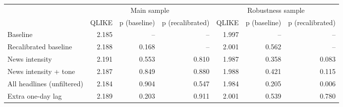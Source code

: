 \begin{tabular}{lrrrrrr}
\toprule
 & \multicolumn{3}{c}{Main sample} & \multicolumn{3}{c}{Robustness sample} \\
 & QLIKE & p (baseline) & p (recalibrated) & QLIKE & p (baseline) & p (recalibrated) \\
\midrule
Baseline & 2.185 & -- & -- & 1.997 & -- & -- \\
Recalibrated baseline & 2.188 & 0.168 & -- & 2.001 & 0.562 & -- \\
News intensity & 2.191 & 0.553 & 0.810 & 1.987 & 0.358 & 0.083 \\
News intensity + tone & 2.187 & 0.849 & 0.880 & 1.988 & 0.421 & 0.115 \\
All headlines (unfiltered) & 2.184 & 0.904 & 0.547 & 1.984 & 0.205 & 0.006 \\
Extra one-day lag & 2.189 & 0.203 & 0.911 & 2.001 & 0.539 & 0.780 \\
\bottomrule
\end{tabular}
